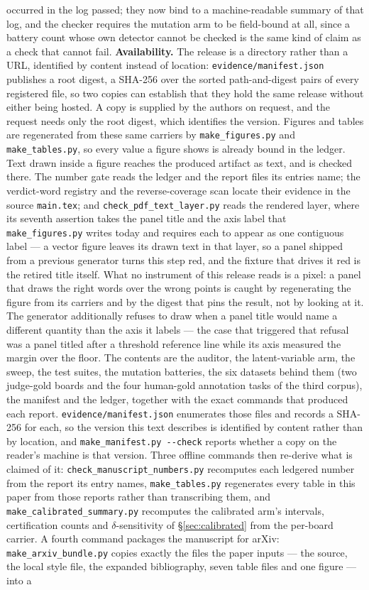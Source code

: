 \documentclass{article}
\newcommand{\ids}[1]{\texttt{\small #1}} %
\begin{document}
occurred in the log passed; they now bind to a machine-readable summary of that log, and the checker requires the mutation arm to be field-bound at all, since a battery count whose own detector cannot be checked is the same kind of claim as a check that cannot fail. \textbf{Availability.} The release is a directory rather than a URL, identified by content instead of location: \ids{evidence/manifest.json} publishes a root digest, a SHA-256 over the sorted path-and-digest pairs of every registered file, so two copies can establish that they hold the same release without either being hosted. A copy is supplied by the authors on request, and the request needs only the root digest, which identifies the version. Figures and tables are regenerated from these same carriers by \ids{make\_figures.py} and \ids{make\_tables.py}, so every value a figure shows is already bound in the ledger. Text drawn inside a figure reaches the produced artifact as text, and is checked there. The number gate reads the ledger and the report files its entries name; the verdict-word registry and the reverse-coverage scan locate their evidence in the source \texttt{main.tex}; and \ids{check\_pdf\_text\_layer.py} reads the rendered layer, where its seventh assertion takes the panel title and the axis label that \ids{make\_figures.py} writes today and requires each to appear as one contiguous label --- a vector figure leaves its drawn text in that layer, so a panel shipped from a previous generator turns this step red, and the fixture that drives it red is the retired title itself. What no instrument of this release reads is a pixel: a panel that draws the right words over the wrong points is caught by regenerating the figure from its carriers and by the digest that pins the result, not by looking at it. The generator additionally refuses to draw when a panel title would name a different quantity than the axis it labels --- the case that triggered that refusal was a panel titled after a threshold reference line while its axis measured the margin over the floor. The contents are the auditor, the latent-variable arm, the sweep, the test suites, the mutation batteries, the six datasets behind them (two judge-gold boards and the four human-gold annotation tasks of the third corpus), the manifest and the ledger, together with the exact commands that produced each report. \ids{evidence/manifest.json} enumerates those files and records a SHA-256 for each, so the version this text describes is identified by content rather than by location, and \ids{make\_manifest.py -{}-check} reports whether a copy on the reader's machine is that version. Three offline commands then re-derive what is claimed of it: \ids{check\_manuscript\_numbers.py} recomputes each ledgered number from the report its entry names, \ids{make\_tables.py} regenerates every table in this paper from those reports rather than transcribing them, and \ids{make\_calibrated\_summary.py} recomputes the calibrated arm's intervals, certification counts and $\delta$-sensitivity of \S\ref{sec:calibrated} from the per-board carrier. A fourth command packages the manuscript for arXiv: \ids{make\_arxiv\_bundle.py} copies exactly the files the paper inputs --- the source, the local style file, the expanded bibliography, seven table files and one figure --- into a 
\end{document}
